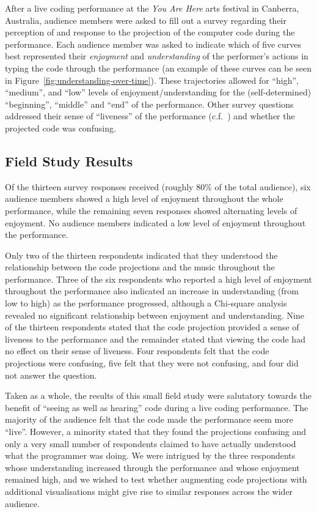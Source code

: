\documentclass{sig-alternate}
\begin{document}
After a live coding performance at the \emph{You Are Here} arts
festival in Canberra, Australia, audience members were asked to fill
out a survey regarding their perception of and response to the
projection of the computer code during the performance. Each audience
member was asked to indicate which of five curves best represented
their \emph{enjoyment} and \emph{understanding} of the performer's
actions in typing the code through the performance (an example of
these curves can be seen in Figure~\ref{fig:understanding-over-time}).
These trajectories allowed for ``high'', ``medium'', and ``low''
levels of enjoyment/understanding for the (self-determined)
``beginning'', ``middle'' and ``end'' of the performance. Other survey
questions addressed their sense of ``liveness'' of the performance
(c.f.~\cite{Auslander}) and whether the projected code was confusing.

\subsection{Field Study Results}

Of the thirteen survey responses received (roughly $80\%$ of the total
audience), six audience members showed a high level of enjoyment
throughout the whole performance, while the remaining seven responses
showed alternating levels of enjoyment. No audience members indicated
a low level of enjoyment throughout the performance.

Only two of the thirteen respondents indicated that they understood
the relationship between the code projections and the music throughout
the performance. Three of the six respondents who reported a high
level of enjoyment throughout the performance also indicated an
increase in understanding (from low to high) as the performance
progressed, although a Chi-square analysis revealed no significant
relationship between enjoyment and understanding. Nine of the thirteen
respondents stated that the code projection provided a sense of
liveness to the performance and the remainder stated that viewing the
code had no effect on their sense of liveness. Four respondents felt
that the code projections were confusing, five felt that they were not
confusing, and four did not answer the question.

Taken as a whole, the results of this small field study were
salutatory towards the benefit of ``seeing as well as hearing'' code
during a live coding performance. The majority of the audience felt
that the code made the performance seem more ``live''. However, a
minority stated that they found the projections confusing and only a
very small number of respondents claimed to have actually understood
what the programmer was doing. We were intrigued by the three
respondents whose understanding increased through the performance and
whose enjoyment remained high, and we wished to test whether
augmenting code projections with additional visualisations might give
rise to similar responses across the wider audience.
\end{document}
